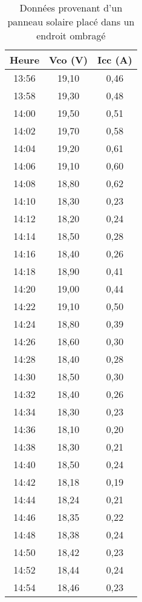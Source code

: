 \begin{table}[H]
	\centering
	\caption{Données provenant d'un panneau solaire placé dans un endroit ombragé}
	\vspace{5mm}
	\begin{minipage}[t]{0.45\linewidth}
		\centering
		\begin{tabular}{|c|c|c|}
			\hline
			\textbf{Heure} & \textbf{Vco (V)} & \textbf{Icc (A)} \\
			\hline
			13:56 & 19,10 & 0,46 \\
			13:58 & 19,30 & 0,48 \\
			14:00 & 19,50 & 0,51 \\
			14:02 & 19,70 & 0,58 \\
			14:04 & 19,20 & 0,61 \\
			14:06 & 19,10 & 0,60 \\
			14:08 & 18,80 & 0,62 \\
			14:10 & 18,30 & 0,23 \\
			14:12 & 18,20 & 0,24 \\
			14:14 & 18,50 & 0,28 \\
			14:16 & 18,40 & 0,26 \\
			14:18 & 18,90 & 0,41 \\
			14:20 & 19,00 & 0,44 \\
			14:22 & 19,10 & 0,50 \\
			14:24 & 18,80 & 0,39 \\
			14:26 & 18,60 & 0,30 \\
			14:28 & 18,40 & 0,28 \\
			14:30 & 18,50 & 0,30 \\
			14:32 & 18,40 & 0,26 \\
			14:34 & 18,30 & 0,23 \\
			14:36 & 18,10 & 0,20 \\
			14:38 & 18,30 & 0,21 \\
			14:40 & 18,50 & 0,24 \\
			14:42 & 18,18 & 0,19 \\
			14:44 & 18,24 & 0,21 \\
			14:46 & 18,35 & 0,22 \\
			14:48 & 18,38 & 0,24 \\
			14:50 & 18,42 & 0,23 \\
			14:52 & 18,44 & 0,24 \\
			14:54 & 18,46 & 0,23 \\
			\hline
		\end{tabular}
	\end{minipage}

\end{table}

